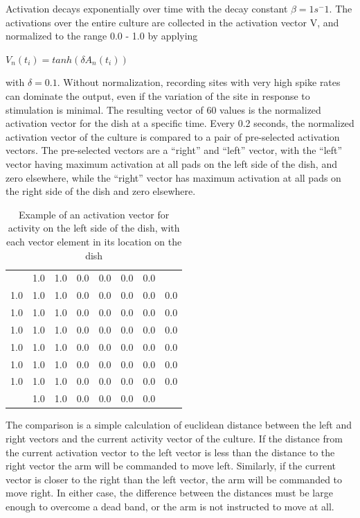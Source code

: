 \documentclass[letterpaper]{article}
\begin{document}
Activation decays exponentially over time with the decay constant $\beta=1s^-1$.
The activations over the entire culture are collected in the activation vector V, and normalized to the range 0.0 - 1.0 by applying

$V_n(t_i) = tanh(\delta A_n(t_i))$

with $\delta=0.1$. Without normalization, recording sites with very high spike rates can dominate the output, even if the variation of the site in response to stimulation is minimal. 
The resulting vector of 60 values is the normalized activation vector for the dish at a specific time.
Every 0.2 seconds, the normalized activation vector of the culture is compared to a pair of pre-selected activation vectors. 
The pre-selected vectors are a ``right'' and ``left'' vector, with the ``left'' vector having maximum activation at all pads on the left side of the dish, and zero elsewhere, while the ``right'' vector has maximum activation at all pads on the right side of the dish and zero elsewhere. 

\begin{table}
\begin{tabular}{cccccccc}
 & 1.0 & 1.0 & 0.0 & 0.0 & 0.0 & 0.0 &  \\ 
1.0 & 1.0 & 1.0 & 0.0 & 0.0 & 0.0 & 0.0 & 0.0 \\ 
1.0 & 1.0 & 1.0 & 0.0 & 0.0 & 0.0 & 0.0 & 0.0 \\ 
1.0 & 1.0 & 1.0 & 0.0 & 0.0 & 0.0 & 0.0 & 0.0 \\ 
1.0 & 1.0 & 1.0 & 0.0 & 0.0 & 0.0 & 0.0 & 0.0 \\ 
1.0 & 1.0 & 1.0 & 0.0 & 0.0 & 0.0 & 0.0 & 0.0 \\ 
1.0 & 1.0 & 1.0 & 0.0 & 0.0 & 0.0 & 0.0 & 0.0 \\ 
 & 1.0 & 1.0 & 0.0 & 0.0 & 0.0 & 0.0 &  \\ 
\end{tabular}
\caption{Example of an activation vector for activity on the left side of the dish, with each vector element in its location on the dish} 
\end{table}

The comparison is a simple calculation of euclidean distance between the left and right vectors and the current activity vector of the culture. 
If the distance from the current activation vector to the left vector is less than the distance to the right vector the arm will be commanded to move left. 
Similarly, if the current vector is closer to the right than the left vector, the arm will be commanded to move right. 
In either case, the difference between the distances must be large enough to overcome a dead band, or the arm is not instructed to move at all. 
\end{document}
